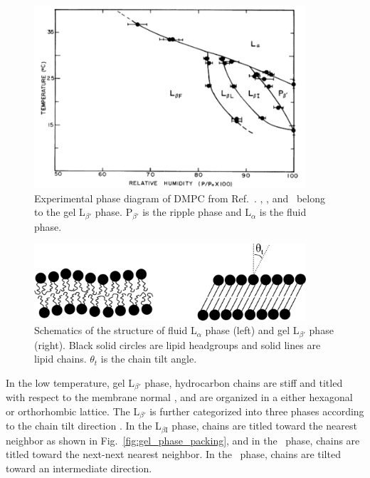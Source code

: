\begin{figure}[htbp]
  \centering
  \includegraphics[width=0.9\textwidth]{figures/ripple/smith_phase_diagram}
  \caption{Experimental phase diagram of DMPC from Ref.~\cite{ref:Smith88}.
  \LbetaI, \LbetaL, and \LbetaF\ belong to the gel L$_{\beta'}$ phase. P$_{\beta'}$ is 
  the ripple phase and L$_\alpha$ is the fluid phase.}
  \label{fig:phase_diagram}
\end{figure}

\begin{figure}[htbp]
  \centering
  \includegraphics[width=0.9\textwidth]{figures/ripple/various_phases}
  \caption[]{Schematics of the structure of fluid L$_\alpha$ phase (left) and 
  gel L$_{\beta'}$ phase (right). Black solid circles are lipid headgroups 
  and solid lines are lipid chains. $\theta_t$ is the chain tilt angle.}
  \label{fig:various_phases}
\end{figure}

In the low temperature, gel L$_{\beta'}$
phase, hydrocarbon chains are stiff and titled with respect to the membrane
normal \cite{ref:Tardieu73}, and are organized in a either hexagonal 
or orthorhombic lattice. 
The L$_{\beta'}$ is further categorized into three phases according to the 
chain tilt direction \cite{ref:Smith88}. 
In the L$_{\beta\text{I}}$ phase, chains are titled toward the 
nearest neighbor as shown in Fig.~\ref{fig:gel_phase_packing}, and
in the \LbetaF\ phase, chains are titled toward the next-next nearest neighbor.
In the \LbetaL\ phase, chains are tilted toward an intermediate direction.

